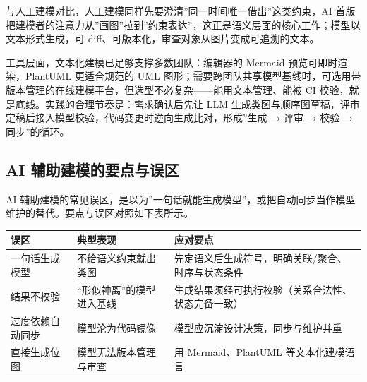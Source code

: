 \documentclass[12pt,a4paper,twoside,openany]{ctexbook}
\numberwithin{figure}{chapter}
\numberwithin{table}{chapter}
\newcounter{none}
\begin{document}
与人工建模对比，人工建模同样先要澄清''同一时间唯一借出''这类约束，AI
首版把建模者的注意力从''画图''拉到''约束表达''，这正是语义层面的核心工作；模型以文本形式生成，可
diff、可版本化，审查对象从图片变成可追溯的文本。

工具层面，文本化建模已足够支撑多数团队：编辑器的 Mermaid
预览可即时渲染，PlantUML 更适合规范的 UML
图形；需要跨团队共享模型基线时，可选用带版本管理的在线建模平台，但选型不必复杂------能用文本管理、能被
CI 校验，就是底线。实践的合理节奏是：需求确认后先让 LLM
生成类图与顺序图草稿，评审定稿后接入模型校验，代码变更时逆向生成比对，形成''生成
→ 评审 → 校验 → 同步''的循环。

\subsection{AI
辅助建模的要点与误区}\label{ai-ux8f85ux52a9ux5efaux6a21ux7684ux8981ux70b9ux4e0eux8befux533a}

AI
辅助建模的常见误区，是以为''一句话就能生成模型''，或把自动同步当作模型维护的替代。要点与误区对照如下表所示。

{\def\LTcaptype{none} %
\begin{longtable}[]{@{}
  >{\raggedright\arraybackslash}p{}
  >{\raggedright\arraybackslash}p{}
  >{\raggedright\arraybackslash}p{}@{}}
\toprule\noalign{}
\begin{minipage}[b]{\linewidth}\raggedright
误区
\end{minipage} & \begin{minipage}[b]{\linewidth}\raggedright
典型表现
\end{minipage} & \begin{minipage}[b]{\linewidth}\raggedright
应对要点
\end{minipage} \\
\midrule\noalign{}
\endhead
\bottomrule\noalign{}
\endlastfoot
一句话生成模型 & 不给语义约束就出类图 &
先定语义后生成符号，明确关联/聚合、时序与状态条件 \\
结果不校验 & ``形似神离''的模型进入基线 &
生成结果须经可执行校验（关系合法性、状态完备一致） \\
过度依赖自动同步 & 模型沦为代码镜像 &
模型应沉淀设计决策，同步与维护并重 \\
直接生成位图 & 模型无法版本管理与审查 & 用 Mermaid、PlantUML
等文本化建模语言 \\
\end{longtable}
}
\end{document}
